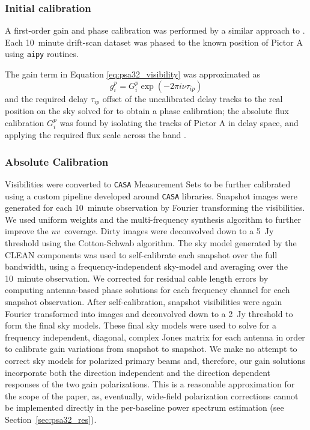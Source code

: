 \subsubsection{Initial calibration}
A first-order gain and phase calibration was performed by a similar approach to \citet{Jacobs.13}. Each 10~minute drift-scan dataset was phased to the known position of Pictor A using {\tt aipy} routines.

The gain term in Equation \ref{eq:psa32_visibility} was approximated as 
\begin{equation}
 g^p_i = G^p_i \exp(-2\pi i \nu \tau_{ip})
\end{equation}
and the required delay $\tau_{ip}$ offset of the uncalibrated delay tracks to the real position on the sky solved for to obtain a phase calibration; the absolute flux calibration $G^p_i$ was found by isolating the tracks of Pictor A in delay space, and applying the required flux scale across the band \citep[for a discussion of delay-space calibration, see][and Figure~\ref{fig:psa32_delay_spectra}]{Parsons.12a}.

\subsubsection{Absolute Calibration}
\label{subsubsec:psa32_abscal}

Visibilities were converted to {\tt CASA} Measurement Sets to be further calibrated using a custom pipeline developed around {\tt CASA} libraries. Snapshot images were generated for each 10~minute observation by Fourier transforming the visibilities. 
We used uniform weights and the multi-frequency synthesis algorithm to further improve the $uv$~coverage. 
Dirty images were deconvolved down to a 5~Jy threshold using the Cotton-Schwab algorithm. 
The sky model generated by the CLEAN components was used to self-calibrate each snapshot over the full bandwidth, using a frequency-independent sky-model and averaging over the 10~minute observation.
We corrected for residual cable length errors by computing antenna-based phase solutions for each frequency channel for each snapshot observation. 
After self-calibration, snapshot visibilities were again Fourier transformed into images and deconvolved down to a 2~Jy threshold to form the final sky models. 
These final sky models were used to solve for a frequency independent, diagonal, complex Jones matrix \citep{HBS.1.96,Smirnov.11} for each antenna in order to calibrate gain variations from snapshot to snapshot. 
We make no attempt to correct sky models for polarized primary beams and, therefore, our gain solutions incorporate both the direction independent and the direction dependent responses of the two gain polarizations. 
This is a reasonable approximation for the scope of the paper, as, eventually, wide-field polarization corrections cannot be implemented directly in the per-baseline 
power spectrum estimation (see Section~\ref{sec:psa32_res}).

